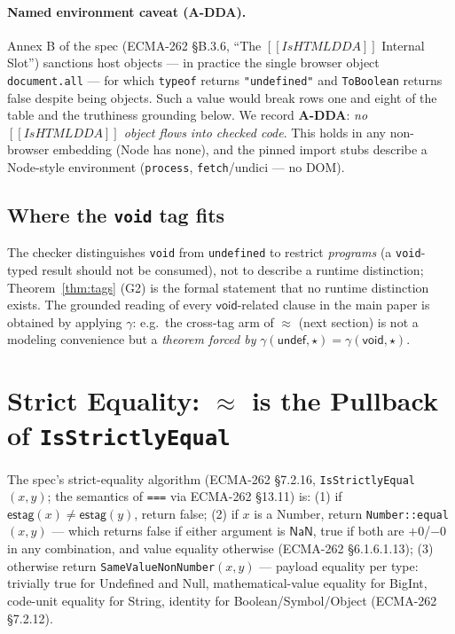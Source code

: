 \documentclass[11pt]{article}
\newcommand{\estag}{\mathsf{estag}}
\newcommand{\realize}{\gamma}
\newcommand{\ecma}[1]{ECMA-262 \S#1}
\newcommand{\intm}[1]{[[#1]]}
\begin{document}
\paragraph{Named environment caveat (A-DDA).}
Annex B of the spec (\ecma{B.3.6}, ``The $\intm{IsHTMLDDA}$ Internal
Slot'') sanctions host objects — in practice the single browser object
\texttt{document.all} — for which \texttt{typeof} returns
\texttt{"undefined"} and \texttt{ToBoolean} returns \textsf{false}
despite being objects. Such a value would break rows one and eight of the
table and the truthiness grounding below. We record
\textbf{A-DDA}: \emph{no $\intm{IsHTMLDDA}$ object flows into checked
code}. This holds in any non-browser embedding (Node has none), and the
pinned import stubs describe a Node-style environment
(\texttt{process}, \texttt{fetch}/undici — no DOM).

\subsection{Where the \texttt{void} tag fits}

The checker distinguishes \texttt{void} from \texttt{undefined} to
restrict \emph{programs} (a \texttt{void}-typed result should not be
consumed), not to describe a runtime distinction; Theorem~\ref{thm:tags}
(G2) is the formal statement that no runtime distinction exists. The
grounded reading of every $\mathsf{void}$-related clause in the main
paper is obtained by applying $\realize$: e.g.\ the cross-tag arm of
$\approx$ (next section) is not a modeling convenience but a
\emph{theorem forced by} $\realize(\mathsf{undef},\star) =
\realize(\mathsf{void},\star)$.

\section{Strict Equality: $\approx$ is the Pullback of
\texttt{IsStrictlyEqual}}
\label{sec:seq}

The spec's strict-equality algorithm (\ecma{7.2.16},
\texttt{IsStrictlyEqual}$(x, y)$; the semantics of \texttt{===} via
\ecma{13.11}) is:
(1) if $\estag(x) \neq \estag(y)$, return \textsf{false};
(2) if $x$ is a Number, return
\texttt{Number::equal}$(x,y)$ — which returns \textsf{false} if either
argument is $\mathsf{NaN}$, \textsf{true} if both are $+0$/$-0$ in any
combination, and value equality otherwise (\ecma{6.1.6.1.13});
(3) otherwise return \texttt{SameValueNonNumber}$(x,y)$ — payload
equality per type: trivially \textsf{true} for Undefined and Null,
mathematical-value equality for BigInt, code-unit equality for String,
identity for Boolean/Symbol/Object (\ecma{7.2.12}).
\end{document}
